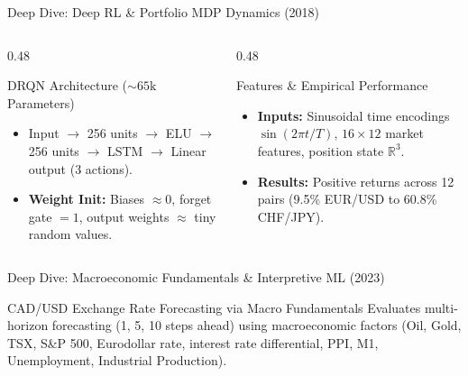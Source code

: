 \documentclass[aspectratio=169]{beamer}
\begin{document}
\begin{frame}{Deep Dive: Deep RL \& Portfolio MDP Dynamics (2018)}

	\begin{columns}[T]
		\begin{column}{0.48\textwidth}
			\begin{block}{DRQN Architecture ($\sim 65\text{k}$ Parameters)}
				\begin{itemize}
					\item Input $\to$ 256 units $\to$ ELU $\to$ 256 units $\to$ LSTM $\to$ Linear output (3 actions).
					\item \textbf{Weight Init:} Biases $\approx 0$, forget gate $= 1$, output weights $\approx$ tiny random values.
				\end{itemize}
			\end{block}
		\end{column}
		\begin{column}{0.48\textwidth}
			\begin{block}{Features \& Empirical Performance}
				\begin{itemize}
					\item \textbf{Inputs:} Sinusoidal time encodings $\sin(2\pi t/T)$, $16 \times 12$ market features, position state $\mathbb{R}^3$.
					\item \textbf{Results:} Positive returns across 12 pairs (9.5\% EUR/USD to 60.8\% CHF/JPY).
				\end{itemize}
			\end{block}
		\end{column}
	\end{columns}
\end{frame}


\begin{frame}{Deep Dive: Macroeconomic Fundamentals \& Interpretive ML (2023)}
	\begin{block}{CAD/USD Exchange Rate Forecasting via Macro Fundamentals}
		Evaluates multi-horizon forecasting (1, 5, 10 steps ahead) using macroeconomic factors (Oil, Gold, TSX, S\&P 500, Eurodollar rate, interest rate differential, PPI, M1, Unemployment, Industrial Production).
	\end{block}

\end{frame}
\end{document}

